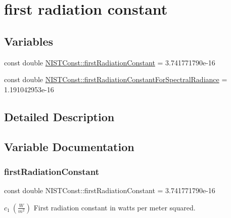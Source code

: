 \hypertarget{group___first_radiation_constant}{}\section{first radiation constant}
\label{group___first_radiation_constant}
\subsection*{Variables}
\begin{DoxyCompactItemize}
\item 
const double \hyperlink{group___first_radiation_constant_ga59a54a84c539969a14695bd822b116cb}{N\+I\+S\+T\+Const\+::first\+Radiation\+Constant} = 3.\+741771790e-\/16
\item 
const double \hyperlink{group___first_radiation_constant_ga877c0bc2579b88ae515b80aeb58aa68e}{N\+I\+S\+T\+Const\+::first\+Radiation\+Constant\+For\+Spectral\+Radiance} = 1.\+191042953e-\/16
\end{DoxyCompactItemize}


\subsection{Detailed Description}


\subsection{Variable Documentation}
\mbox{\label{group___first_radiation_constant_ga59a54a84c539969a14695bd822b116cb}} 
\subsubsection{\texorpdfstring{first\+Radiation\+Constant}{firstRadiationConstant}}
{\footnotesize\ttfamily const double N\+I\+S\+T\+Const\+::first\+Radiation\+Constant = 3.\+741771790e-\/16}

$c_1 \ (\frac{W}{m^2})$ First radiation constant in watts per meter squared. \mbox{\label{group___first_radiation_constant_ga877c0bc2579b88ae515b80aeb58aa68e}} 
